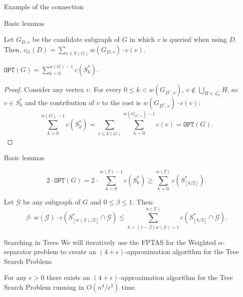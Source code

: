 \documentclass{beamer}
\newcommand{\br}[1]{\mathopen{}\left( #1 \right)}
\newcommand{\fl}[1]{\mathopen{}\left\lfloor #1 \right\rfloor}
\newcommand{\OPT}{\texttt{OPT}}
\begin{document}
\begin{frame}{Example of the connection}

\end{frame}

\begin{frame}{Basic lemmas}
\begin{lemma}\label{contributionLemma}
Let $G_{D,v}$ be the candidate subgraph of $G$ in which 
$v$ is queried when using $D$. Then,
$
c_G\br{D} = \sum_{v \in V\br{G}} w\br{G_{D,v}} \cdot c\br{v}.
$
\end{lemma}
    \pause
\begin{lemma}
    $\OPT\br{G}=\sum_{k=0}^{w\br{G}-1}c\br{S_{k}^*}.$
    \pause
    \begin{proof}
        Consider any vertex $v$. For every $0\leq k<w\br{G_{D^*,v}}$, $v\notin \bigcup_{H\in \mathcal{L}_{k}^*}H$, so $v\in S_{k}^*$ and the contribution of $v$ to the cost is $w\br{G_{D^*,v}}\cdot c\br{v}$:
        $$\sum_{k=0}^{w\br{G}-1}c\br{S_{k}^*}=\sum_{v\in V\br{G}}\sum_{k=0}^{w\br{G_{D^*,v}}-1}c\br{v}=\OPT\br{G}.$$
    \end{proof}
\end{lemma}
\end{frame}

\begin{frame}{Basic lemmas}
\begin{lemma}\label{lb_opt}
    $$
    2\cdot\OPT\br{G}= 2\cdot\sum_{k=0}^{w\br{T}-1}c\br{S_{k}^*} \geq \sum_{k=0}^{w\br{T}}c\br{S_{\fl{k/2}}^*}.
    $$
\end{lemma}
    \pause
\begin{lemma}\label{splitting}
    Let $\mathcal{G}$ be any subgraph of $G$ and $0\leq\beta\leq 1$. Then: 
            $$
           \beta\cdot w\br{\mathcal{G}}\cdot c\br{S_{\fl{w\br{\mathcal{G}}/2}}^*\cap \mathcal{G}}
            \leq \sum_{k=\br{1-\beta}w\br{\mathcal{G}}+1}^{w\br{\mathcal{G}}}c\br{S_{\fl{k/2}}^*\cap \mathcal{G}}.
            $$
\end{lemma}
\end{frame}



\begin{frame}{Searching in Trees}
We will iteratively use the FPTAS for the Weighted $\alpha$-separator problem to create an $\br{4+\epsilon}$-approximation algorithm for the Tree Search Problem:
\pause
\begin{theorem}
    For any $\epsilon>0$ there exists an $\br{4+\epsilon}$-approximation algorithm for the Tree Search Problem running in $O\br{n^4/\epsilon^2}$ time.
\end{theorem}
    
\end{frame}
\end{document}
